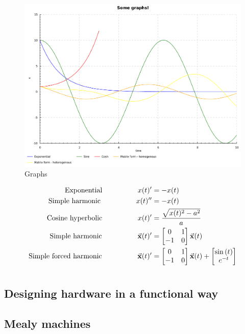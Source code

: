 \begin{figure}[h!]
	\centering
	\includegraphics[width=\textwidth]{../haskell/output.pdf}
	\caption{Graphs}
	\label{f:solver_example}
\end{figure}

\begin{align}
\text{Exponential}\hspace{50pt}{}			x(t)' &= -x(t)  \\
\text{Simple harmonic}\hspace{50pt}{}		x(t)'' &= -x(t) \\
\text{Cosine hyperbolic}\hspace{50pt}{}		x(t)' &= \frac{\sqrt{x(t)^{2} - a^{2}}}{a} \\
\text{Simple harmonic}\hspace{50pt}{}		\vec{\mathbf{x}}(t)' &= \begin{bmatrix} 0 & 1 \\ -1 & 0 \\ \end{bmatrix}\vec{\mathbf{x}}(t) \\
\text{Simple forced harmonic}\hspace{50pt}{}	\vec{\mathbf{x}}(t)' &= \begin{bmatrix} 0 & 1 \\ -1 & 0 \\ \end{bmatrix}\vec{\mathbf{x}}(t) + \begin{bmatrix} \sin{(t)} \\ e^{-t} \\ \end{bmatrix}
\end{align}







\section{\clash{}}
\label{s:clash}
\subsection{Designing hardware in a functional way}
\subsection{Mealy machines}